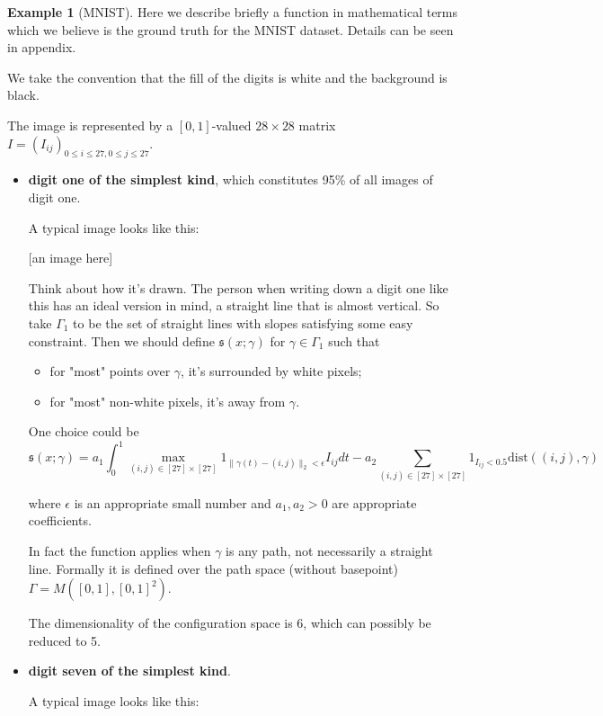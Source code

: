\documentclass[11pt, oneside]{article}   	%
\theoremstyle{definition}
\newtheorem*{example}{Example}
\begin{document}
\begin{example}[MNIST] Here we describe briefly a function in mathematical terms which we believe is the ground truth for the MNIST dataset. Details can be seen in appendix.

We take the convention that the fill of the digits is white and the background is black.

The image is represented by a $[0,1]$-valued $28\times 28$ matrix $I=(I_{ij})_{0\le i\le 27, 0\le j\le 27}$.

\begin{itemize}
	\item \textbf{digit one of the simplest kind}, which constitutes 95\% of all images of digit one.

A typical image looks like this:

[an image here]

Think about how it's drawn. The person when writing down a digit one like this has an ideal version in mind, a straight line that is almost vertical. So take $\Gamma_1$ to be the set of straight lines with slopes satisfying some easy constraint. Then we should define $\mathfrak{s}(x;\gamma)$ for $\gamma\in \Gamma_1$ such that
\begin{itemize}
	\item for "most" points over $\gamma$, it's surrounded by white pixels;
	\item for "most" non-white pixels, it's away from $\gamma$.
\end{itemize}

One choice could be
\begin{equation}
	\mathfrak{s}(x; \gamma)=a_1\int_{0}^1  \max_{(i,j)\in [27]\times[27]}1_{\|\gamma(t) - (i,j)\|_2 < \epsilon} I_{ij}dt
	-
	a_2\sum_{(i,j)\in [27]\times[27]} 1_{I_{ij}< 0.5}\text{dist}((i,j), \gamma)
\end{equation}

where $\epsilon$ is an appropriate small number and $a_1,a_2>0$ are appropriate coefficients.

In fact the function applies when $\gamma$ is any path, not necessarily a straight line. Formally it is defined over the path space (without basepoint) $\Gamma= M([0,1], [0,1]^2)$.

The dimensionality of the configuration space is 6, which can possibly be reduced to 5.

\item \textbf{digit seven of the simplest kind}.

A typical image looks like this:


\end{itemize}
\end{example}
\end{document}
